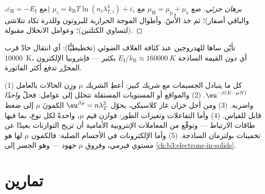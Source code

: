 \begin{proof}[برهان جزئي]
ضع $\mu_{\text{H}} = \mu_{\text{p}} + \mu_{\text{e}}$ مع $\mu_i
= k_{\text{B}}T\ln(n_i\lambda_{T,i}^3) + \varepsilon_i$
(مع $\varepsilon_{\text{H}} = -E_{\text{I}}$، والباقي أصفار)؛
ثم خذ الأُسّ. وأطوال الموجة الحرارية للبروتون وللذرة تكاد
تتلاشى (لتساوي الكتلتين)؛ وعوامل الانحلال مقبولة.
\end{proof}

\begin{omfigure}

{\small تأيّن ساها للهدروجين عند كثافة الغلاف الضوئي
(تخطيطيًّا): أي انتقال حادّ قرب \qty{10000}{K}، أي دون
القيمة الساذجة $E_{\text{I}}/k_{\text{B}} \approx \qty{160000}{K}$ بكثير ---
فإنتروبيا الإلكترون المحرَّر تدفع أكثر الفاتورة.}
\end{omfigure}

\begin{method}\label{met:b3:grand-canonical:method}
(1) كل ما يتبادل الجسيمات مع شريك كبير: أعطِ
الشريك $\mu$ وزِن الحالات بالعامل $\eu^{-\beta(E - \mu N)}$.
(2) والمواقع أو المستويات المستقلة تتحلل إلى عوامل: فحلّ \emph{واحدًا}
واضربه. (3) ومن أجل خزان غاز كلاسيكي، يحوّل $\eu^{\beta\mu} =
n\lambda_T^3$ الكمونَ $\mu$ إلى ضغط قابل للقياس. (4) وأما التفاعلات
وتغيرات الطور: فوازن قيم $\mu$، واحدةً لكل نوع، بما فيها طاقات
الارتباط --- وتوقّع من المعاملات الإنتروبية الأمامية أن تزيح
التوازنات بعيدًا عن تخمينات بولتزمان الساذجة. (5) وأما الإلكترونات في
الأجسام الصلبة: فالكمون $\mu$ لها هو مستوي فيرمي، وفروق $\mu$
جهود --- وهو الجسر إلى
\cref{ch:b3:electrons-in-solids}.
\end{method}

\section{تمارين}


